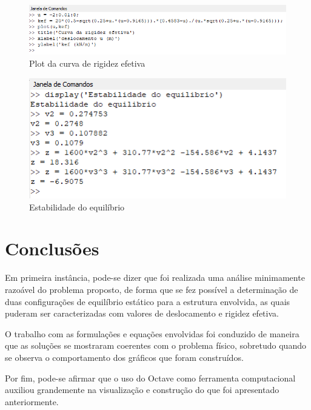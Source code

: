 \documentclass[a4paper, 12pt]{article}
\begin{document}
	\begin{figure}[H]
		\centering
		\includegraphics[scale=0.7]{img4.png}
		\caption{Plot da curva de rigidez efetiva}
	\end{figure}
	
	\begin{figure}[H]
		\centering
		\includegraphics[scale=0.7]{img5.png}
		\caption{Estabilidade do equilíbrio}
	\end{figure}
	
	\newpage
	
	\section{Conclusões}
	
	Em primeira instância, pode-se dizer que foi realizada uma análise minimamente razoável do problema proposto, de forma
	que se fez possível a determinação de duas configurações de equilíbrio estático para a estrutura envolvida, as quais 
	puderam ser caracterizadas com valores de deslocamento e rigidez efetiva.
	
	O trabalho com as formulações e equações envolvidas foi conduzido de maneira que as soluções se mostraram coerentes
	com o problema físico, sobretudo quando se observa o comportamento dos gráficos que foram construídos.
	
	Por fim, pode-se afirmar que o uso do Octave como ferramenta computacional auxiliou grandemente na visualização e
	construção do que foi apresentado anteriormente. 
			
\end{document}
